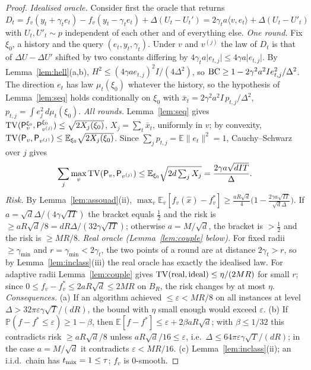 \documentclass[11pt,a4paper]{article}
\numberwithin{equation}{section}
\theoremstyle{definition}
\theoremstyle{remark}
\newcommand{\E}{\mathbb E}\newcommand{\R}{\mathbb R}\newcommand{\Z}{\mathbb Z}\newcommand{\Prob}{\mathbb P}
\newcommand{\norm}[1]{\lVert #1\rVert}\newcommand{\abs}[1]{\lvert #1\rvert}\newcommand{\ip}[2]{\langle #1,#2\rangle}
\begin{document}
\begin{proof}
\emph{Idealised oracle.} Consider first the oracle that returns $D_t=f_v(y_t+\gamma_te_t)-f_v(y_t-\gamma_te_t)+\Delta(U_t-U_t')=2\gamma_ta\ip v{e_t}+\Delta(U_t-U'_t)$ with $U_t,U'_t\sim p$ independent of each other and of everything else.
\emph{One round.} Fix $\xi_0$, a history and the query $(e_t,y_t,\gamma_t)$. Under $v$ and $v^{(j)}$ the law of $D_t$ is that of $\Delta U-\Delta U'$ shifted by two constants differing by $4\gamma_ta\abs{e_{t,j}}\le4\gamma a\abs{e_{t,j}}$. By Lemma~\ref{lem:hell}(a,b), $H^2\le(4\gamma ae_{t,j})^2I/(4\Delta^2)$, so $\mathrm{BC}\ge1-2\gamma^2a^2Ie_{t,j}^2/\Delta^2$. The direction $e_t$ has law $\mu_t(\xi_0)$ whatever the history, so the hypothesis of Lemma~\ref{lem:seq} holds conditionally on $\xi_0$ with $\bar x_t=2\gamma^2a^2I\,p_{t,j}/\Delta^2$, $p_{t,j}=\int e_j^2\,d\mu_t(\xi_0)$.
\emph{All rounds.} Lemma~\ref{lem:seq} gives $\mathrm{TV}(\mathsf P_v^{\xi_0},\mathsf P_{v^{(j)}}^{\xi_0})\le\sqrt{2X_j(\xi_0)}$, $X_j=\sum_t\bar x_t$, uniformly in $v$; by convexity, $\TV(\mathsf P_v,\mathsf P_{v^{(j)}})\le\E_{\xi_0}\sqrt{2X_j(\xi_0)}$. Since $\sum_jp_{t,j}=\E\norm{e_t}^2=1$, Cauchy--Schwarz over $j$ gives
\[
\sum_j\max_v\TV(\mathsf P_v,\mathsf P_{v^{(j)}})\le\E_{\xi_0}\sqrt{2d\textstyle\sum_jX_j}=\frac{2\gamma a\sqrt{dIT}}{\Delta}.
\]
\emph{Risk.} By Lemma~\ref{lem:assouad}(ii), $\max_v\E_v[f_v(\hat x)-f^*_v]\ge\frac{aR\sqrt d}4\big(1-\frac{2\gamma a\sqrt{IT}}{\sqrt d\Delta}\big)$. If $a=\sqrt d\Delta/(4\gamma\sqrt{IT})$ the bracket equals $\frac12$ and the risk is $\ge aR\sqrt d/8=dR\Delta/(32\gamma\sqrt{IT})$; otherwise $a=M/\sqrt d$, the bracket is $>\frac12$ and the risk is $\ge MR/8$.
\emph{Real oracle (Lemma~\ref{lem:couple} below).} For fixed radii $\ge\gamma_{\min}$ and $r=\gamma_{\min}<2\gamma_t$, the two points of a round are at distance $2\gamma_t>r$, so by Lemma~\ref{lem:inclass}(iii) the real oracle has exactly the idealised law. For adaptive radii Lemma~\ref{lem:couple} gives $\mathrm{TV}(\text{real},\text{ideal})\le\eta/(2MR)$ for small $r$; since $0\le f_v-f_v^*\le2aR\sqrt d\le2MR$ on $B_R$, the risk changes by at most $\eta$.
\emph{Consequences.} (a) If an algorithm achieved $\le\varepsilon<MR/8$ on all instances at level $\Delta>32\pi\varepsilon\gamma\sqrt T/(dR)$, the bound with $\eta$ small enough would exceed $\varepsilon$. (b) If $\Prob(f-f^*\le\varepsilon)\ge1-\beta$, then $\E[f-f^*]\le\varepsilon+2\beta aR\sqrt d$; with $\beta\le1/32$ this contradicts risk $\ge aR\sqrt d/8$ unless $aR\sqrt d/16\le\varepsilon$, i.e.\ $\Delta\le64\pi\varepsilon\gamma\sqrt T/(dR)$; in the case $a=M/\sqrt d$ it contradicts $\varepsilon<MR/16$. (c) Lemma~\ref{lem:inclass}(ii); an i.i.d.\ chain has $t_{\rm mix}=1\le\tau$; $f_v$ is $0$-smooth.
\end{proof}
\end{document}
